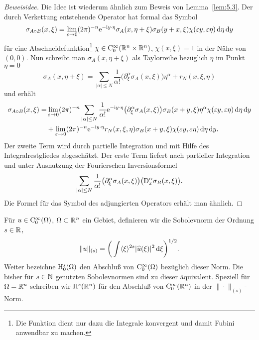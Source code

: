 \begin{proof}[Beweisidee] Die Idee ist wiederum ähnlich zum Beweis von Lemma~\ref{lem:5.3}. Der durch Verkettung entstehende Operator hat formal das Symbol
\begin{equation}
    \sigma_{A\circ B}(x,\xi) = \lim_{\varepsilon\to0}  (2\pi)^{-n} \relax \mathrm e^{-\mathrm i y\cdot\eta  } \sigma_A(x,\eta+\xi) \sigma_B(y+x,\xi) \chi(\varepsilon y,\varepsilon\eta) \,\mathrm d\eta\,\mathrm d y
\end{equation}
für eine Abschneidefunktion\footnote{Die Funktion dient nur dazu die Integrale konvergent und damit Fubini anwendbar zu machen.} $\chi\in\mathrm C_0^\infty(\mathbb R^{n}\times\mathbb R^n)$, $\chi(x,\xi)=1$ in der Nähe von $(0,0)$. Nun schreibt man $\sigma_A(x,\eta+\xi)$ als Taylorreihe bezüglich $\eta$ im Punkt $\eta=0$ 
\begin{equation}
   \sigma_A(x,\eta+\xi) = \sum_{|\alpha|\le N} \frac1{\alpha!} \big(\partial_\xi^\alpha \sigma_A(x,\xi)\big) \eta^\alpha + r_N(x,\xi,\eta)
\end{equation}
und erhält
\begin{equation}
\begin{split}
  \sigma_{A\circ B}(x,\xi) =& \lim_{\varepsilon\to0}  (2\pi)^{-n}  \sum_{|\alpha|\le N}  \frac1{\alpha!} \relax \mathrm e^{-\mathrm i y\cdot\eta  }  \big(\partial_\xi^\alpha \sigma_A(x,\xi)\big) \sigma_B(x+y,\xi)  \eta^\alpha \chi(\varepsilon y, \varepsilon \eta)\,\mathrm d\eta\,\mathrm d y \\
  &+ \lim_{\varepsilon\to0}  (2\pi)^{-n}  \relax \mathrm e^{-\mathrm i y\cdot\eta  }  r_N(x,\xi,\eta) \sigma_B(x+y,\xi)  \chi(\varepsilon y, \varepsilon \eta)\,\mathrm d\eta\,\mathrm d y.
\end{split}
\end{equation}
Der zweite Term wird durch partielle Integration und mit Hilfe des Integralrestgliedes abgeschätzt. Der erste Term liefert nach partieller Integration und unter Ausnutzung der Fourierschen Inversionsformel
\begin{equation}
  \sum_{|\alpha|\le N}  \frac1{\alpha!}  \big(\partial_\xi^\alpha \sigma_A(x,\xi)\big) \big(\mathrm D_x^\alpha \sigma_B(x,\xi)  \big).
\end{equation}
Die Formel für das Symbol des adjungierten Operators erhält man ähnlich.
\end{proof}


\begin{df}[Sobolevnormen]\label{df:sob-norm}
Für $u\in\mathrm C_0^\infty(\Omega)$, $\Omega \subset\mathbb R^n$ ein Gebiet, definieren wir die Sobolevnorm der Ordnung $s\in\mathbb R$,
\begin{equation}
     \| u \|_{(s)} = \bigg(\int \langle\xi\rangle^{2s} |\widehat u(\xi)|^2\,\mathrm d\xi\bigg)^{1/2}. 
\end{equation}
Weiter bezeichne $\mathrm H^s_0(\Omega)$ den Abschluß von $\mathrm C_0^\infty(\Omega)$ bezüglich dieser Norm. Die bisher für $s\in\mathbb N$ genutzten Sobolevnormen sind zu dieser äquivalent. Speziell für $\Omega=\mathbb R^n$ schreiben wir $\mathrm H^s(\mathbb R^n)$ für den Abschluß von $\mathrm C_0^\infty(\mathbb R^n)$ in der $\|\cdot\|_{(s)}$-Norm.
\end{df}

